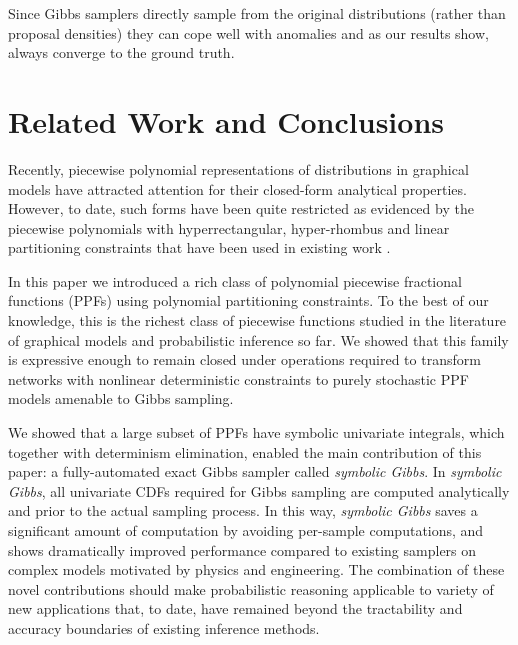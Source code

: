 \documentclass[]{article}
\begin{document}
Since Gibbs samplers directly sample from the original distributions (rather than proposal densities) they can cope well with anomalies and as our results show, always converge to the ground truth. 


 \section{Related Work and Conclusions}
\label{sect:conclusion}

Recently, piecewise polynomial representations of distributions in graphical
models have attracted attention for their closed-form analytical properties.
However, to date, such forms have been quite restricted as evidenced by
the piecewise polynomials with hyperrectangular, hyper-rhombus and
linear partitioning constraints that have been used in existing work 
\citep{shenoy2011inference,shenoy2012two,Sanner:12}.

In this paper we introduced a rich class of polynomial piecewise
fractional functions (PPFs) using polynomial partitioning constraints.
To the best of our knowledge, this is the richest class of piecewise
functions studied in the literature of graphical models and
probabilistic inference so far.  We showed that this family is
expressive enough to remain closed under operations required to
transform networks with nonlinear deterministic constraints to purely
stochastic PPF models amenable to Gibbs sampling.

We showed that a large subset of PPFs have symbolic univariate
integrals, which together with determinism elimination, enabled the
main contribution of this paper: a fully-automated exact Gibbs sampler
called \emph{symbolic Gibbs}.  In \emph{symbolic Gibbs}, all
univariate CDFs required for Gibbs sampling are computed analytically
and prior to the actual sampling process.  In this way, \emph{symbolic
  Gibbs} saves a significant amount of computation by avoiding
per-sample computations, and shows dramatically improved performance
compared to existing samplers on complex models motivated by physics
and engineering. The combination of these novel contributions should
make probabilistic reasoning applicable to variety of new applications
that, to date, have remained beyond the tractability and accuracy
boundaries of existing inference methods.
\end{document}
